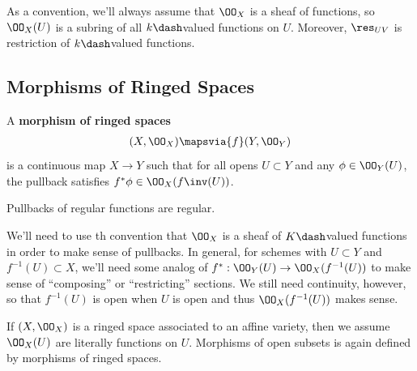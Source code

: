 \begin{remark}

As a convention, we'll always assume that \(\OO_X\) is a sheaf of
functions, so \(\OO_X(U)\) is a subring of all \(k\dash\)valued
functions on \(U\). Moreover, \(\res_{UV}\) is restriction of
\(k\dash\)valued functions.

\end{remark}

\hypertarget{morphisms-of-ringed-spaces}{%
\subsection{Morphisms of Ringed
Spaces}\label{morphisms-of-ringed-spaces}}

\begin{definition}

A \textbf{morphism of ringed spaces}
\begin{align*}  
(X, \OO_X) \mapsvia{f}  (Y, \OO_Y)
\end{align*} is a continuous map \(X\to Y\) such that for all opens
\(U \subset Y\) and any \(\phi \in \OO_Y(U)\), the pullback satisfies
\(f^* \phi \in \OO_X(f\inv(U))\).

\end{definition}

\begin{slogan}

Pullbacks of regular functions are regular.

\end{slogan}

\begin{remark}

We'll need to use th convention that \(\OO_X\) is a sheaf of
\(K\dash\)valued functions in order to make sense of pullbacks. In
general, for schemes with \(U \subset Y\) and \(f^{-1} (U) \subset X\),
we'll need some analog of \(f^*: \OO_Y(U) \to \OO_X(f^{-1} (U) )\) to
make sense of ``composing'' or ``restricting'' sections. We still need
continuity, however, so that \(f^{-1}(U)\) is open when \(U\) is open
and thus \(\OO_X(f^{-1}(U))\) makes sense.

\end{remark}

\begin{example}

If \((X, \OO_X)\) is a ringed space associated to an affine variety,
then we assume \(\OO_X(U)\) are literally functions on \(U\). Morphisms
of open subsets is again defined by morphisms of ringed spaces.

\end{example}

